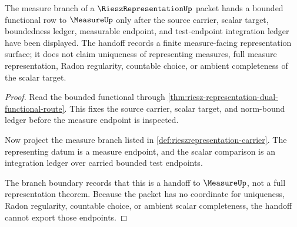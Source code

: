 \begin{theorem}
\label{thm:riesz-representation-measure-handoff}
The measure branch of a $\RieszRepresentationUp$ packet hands a bounded functional row to $\MeasureUp$ only after the source carrier, scalar target, boundedness ledger, measurable endpoint, and test-endpoint integration ledger have been displayed. The handoff records a finite measure-facing representation surface; it does not claim uniqueness of representing measures, full measure representation, Radon regularity, countable choice, or ambient completeness of the scalar target.
\end{theorem}
\begin{proof}
Read the bounded functional through \autoref{thm:riesz-representation-dual-functional-route}. This fixes the source carrier, scalar target, and norm-bound ledger before the measure endpoint is inspected.

Now project the measure branch listed in \autoref{def:rieszrepresentation-carrier}. The representing datum is a measure endpoint, and the scalar comparison is an integration ledger over carried bounded test endpoints.

The branch boundary records that this is a handoff to $\MeasureUp$, not a full representation theorem. Because the packet has no coordinate for uniqueness, Radon regularity, countable choice, or ambient scalar completeness, the handoff cannot export those endpoints.
\end{proof}

